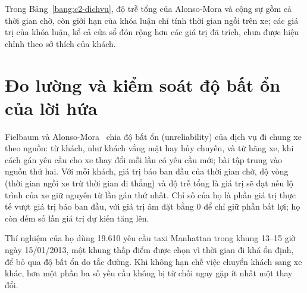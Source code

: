 Trong Bảng~\ref{bang:c2-dichvu}, độ trễ tổng của Alonso-Mora và cộng sự gồm cả thời gian chờ, còn giới hạn của khóa
luận chỉ tính thời gian ngồi trên xe; các giá trị của khóa luận, kể cả cửa sổ đón rộng hơn các giá trị đã trích, chưa
được hiệu chỉnh theo sở thích của khách.

\section{Đo lường và kiểm soát độ bất ổn của lời hứa}
\label{muc:c2-dolech}

Fielbaum và Alonso-Mora~\cite{fielbaum2020} chia độ bất ổn (unreliability) của dịch vụ đi chung xe theo nguồn: từ
khách, như khách vắng mặt hay hủy chuyến, và từ hãng xe, khi cách gán yêu cầu cho xe thay đổi mỗi lần có yêu cầu mới;
bài tập trung vào nguồn thứ hai. Với mỗi khách, giá trị báo ban đầu của thời gian chờ, độ vòng (thời gian ngồi xe trừ
thời gian đi thẳng) và độ trễ tổng là giá trị sẽ đạt nếu lộ trình của xe giữ nguyên từ lần gán thứ nhất. Chỉ số của
họ là phần giá trị thực tế vượt giá trị báo ban đầu, với giá trị âm đặt bằng 0 để chỉ giữ phần bất lợi; họ còn đếm số
lần giá trị dự kiến tăng lên.

Thí nghiệm của họ dùng 19.610 yêu cầu taxi Manhattan trong khung 13--15 giờ ngày 15/01/2013, một khung thấp điểm được
chọn vì thời gian đi khá ổn định, để bỏ qua độ bất ổn do tắc đường. Khi không hạn chế việc chuyển khách sang xe khác,
hơn một phần ba số yêu cầu không bị từ chối ngay gặp ít nhất một thay đổi.

